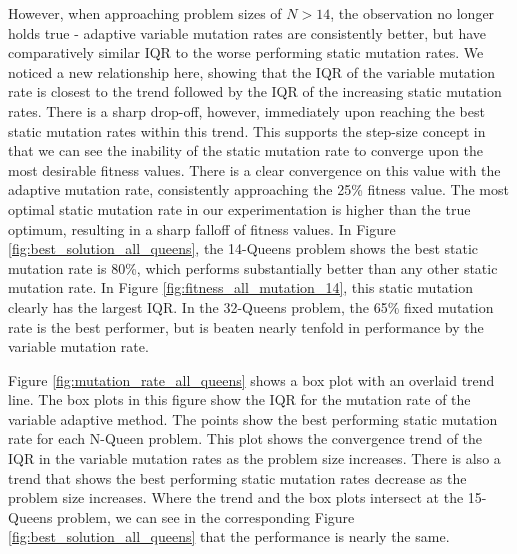 \documentclass[conference]{IEEEtran}
\begin{document}
However, when approaching problem sizes of $N > 14$, the observation no longer holds true - adaptive variable mutation rates are consistently better, but have comparatively similar IQR to the worse performing static mutation rates. We noticed a new relationship here, showing that the IQR of the variable mutation rate is closest to the trend followed by the IQR of the increasing static mutation rates. There is a sharp drop-off, however, immediately upon reaching the best static mutation rates within this trend. This supports the step-size concept in that we can see the inability of the static mutation rate to converge upon the most desirable fitness values. There is a clear convergence on this value with the adaptive mutation rate, consistently approaching the 25\% fitness value. The most optimal static mutation rate in our experimentation is higher than the true optimum, resulting in a sharp falloff of fitness values. In Figure \ref{fig:best_solution_all_queens}, the 14-Queens problem shows the best static mutation rate is 80\%, which performs substantially better than any other static mutation rate. In Figure \ref{fig:fitness_all_mutation_14}, this static mutation clearly has the largest IQR. In the 32-Queens problem, the 65\% fixed mutation rate is the best performer, but is beaten nearly tenfold in performance by the variable mutation rate.

Figure \ref{fig:mutation_rate_all_queens} shows a box plot with an overlaid trend line. The box plots in this figure show the IQR for the mutation rate of the variable adaptive method. The points show the best performing static mutation rate for each N-Queen problem. This plot shows the convergence trend of the IQR in the variable mutation rates as the problem size increases. There is also a trend that shows the best performing static mutation rates decrease as the problem size increases. Where the trend and the box plots intersect at the 15-Queens problem, we can see in the corresponding Figure \ref{fig:best_solution_all_queens} that the performance is nearly the same.
\end{document}
